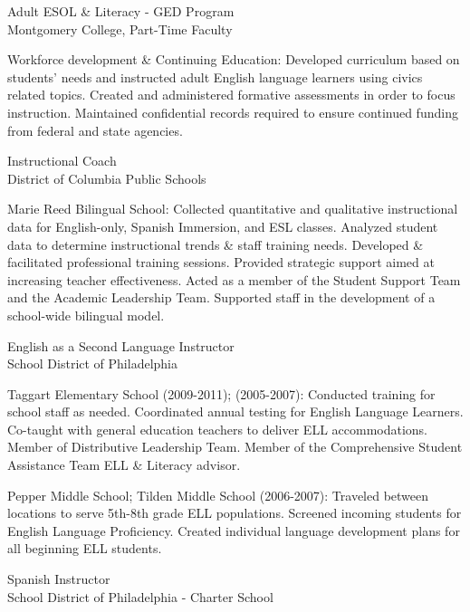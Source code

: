 \documentclass[]{scrartcl}
\begin{document}
\begin{cleanCV}
{Adult ESOL \& Literacy - GED Program}
{\\Montgomery College, Part-Time Faculty}

\JobDesc
{Workforce development \& Continuing Education: }
{Developed curriculum based on students' needs and instructed adult English language learners using civics related topics. Created and administered formative assessments in order to focus instruction. Maintained confidential records required to ensure continued funding from federal and state agencies.}

\newpage

{Instructional Coach}
{\\District of Columbia Public Schools}

\JobDesc
{Marie Reed Bilingual School: }
{Collected quantitative and qualitative instructional data for English-only, Spanish Immersion, and ESL classes. Analyzed student data to determine instructional trends \& staff training needs. Developed \& facilitated professional training sessions. Provided strategic support aimed at increasing teacher effectiveness. Acted as a member of the  Student Support Team and the Academic Leadership Team. Supported staff in the development of a school-wide bilingual model.}


{English as a Second Language Instructor}
{\\School District of Philadelphia}

\JobDesc
{Taggart Elementary School (2009-2011); (2005-2007): }
{Conducted training for school staff as needed. Coordinated annual testing for English Language Learners. Co-taught with general education teachers to deliver ELL accommodations. Member of Distributive Leadership Team. Member of the Comprehensive Student Assistance Team ELL \& Literacy advisor.}

\JobDesc
{Pepper Middle School; Tilden Middle School (2006-2007): }
{Traveled between locations to serve 5th-8th grade ELL populations. 
Screened incoming students for English Language Proficiency.
Created individual language development plans for all beginning ELL students.}

  
{Spanish Instructor}
{\\School District of Philadelphia - Charter School}


\end{cleanCV}
\end{document}
